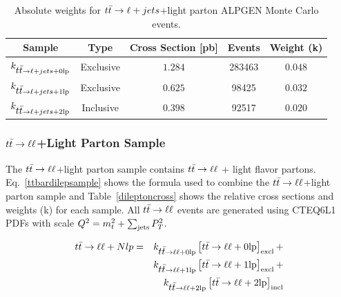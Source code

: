 \begin{table}[!h!tbp]
\begin{center}
\caption{Absolute weights for $\mbox{$t\bar{t}$} \rightarrow \ell + jets$+light parton ALPGEN Monte Carlo events.}
\label{lepjetscross}
\begin{tabular}{c|cccc}
Sample				&	Type		&	Cross Section [pb]	&	Events	&	Weight (k) \\
\hline
$k_{\mbox{$t\bar{t}$} \rightarrow \ell + jets+0\rm{lp}}$	&	Exclusive	&	$1.284$			&	283463	&	$0.048$			\\
$k_{\mbox{$t\bar{t}$} \rightarrow \ell + jets+1\rm{lp}}$	&	Exclusive	&	$0.625$			&	98425	&	$0.032$			\\
$k_{\mbox{$t\bar{t}$} \rightarrow \ell + jets+2\rm{lp}}$	&	Inclusive	&	$0.398$			&	92517	&	$0.020$			\\
\end{tabular}
\vspace{-0.1 in}
\end{center}
\end{table}



\subsubsection{$\mbox{$t\bar{t}$} \rightarrow \ell \ell$+Light Parton Sample}

The $\mbox{$t\bar{t}$} \rightarrow \ell \ell$+light parton sample contains $\mbox{$t\bar{t}$} \rightarrow \ell \ell$ + light flavor partons. Eq.~\ref{ttbardilepsample} shows the formula used to combine the $\mbox{$t\bar{t}$} \rightarrow \ell \ell$+light parton sample and Table~\ref{dileptoncross} shows the relative cross sections and weights (k) for each sample. All $\mbox{$t\bar{t}$} \rightarrow \ell \ell$ events are generated using CTEQ6L1 PDFs with scale $Q^{2}=m_{t}^{2} + \sum_{\rm{jets}}P^{2}_{T}$.

\begin{eqnarray}
\label{ttbardilepsample}
\nonumber
\mbox{$t\bar{t}$} \rightarrow \ell \ell+Nlp&=& k_{\mbox{$t\bar{t}$} \rightarrow \ell \ell+0\rm{lp}} \left[\mbox{$t\bar{t}$} \rightarrow \ell \ell+0\rm{lp}\right]_{\rm{excl}} +\\
\nonumber
& & k_{\mbox{$t\bar{t}$} \rightarrow \ell \ell+1\rm{lp}} \left[\mbox{$t\bar{t}$} \rightarrow \ell \ell+1\rm{lp}\right]_{\rm{excl}} + \\
& & k_{\mbox{$t\bar{t}$} \rightarrow \ell \ell+2\rm{lp}} \left[\mbox{$t\bar{t}$} \rightarrow \ell \ell+2\rm{lp}\right]_{\rm{incl}} 
\end{eqnarray}


